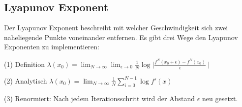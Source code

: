 \documentclass{scrartcl}
\begin{document}
\subsection{Lyapunov Exponent}
Der Lyapunov Exponent beschreibt mit welcher Geschwindigkeit sich zwei naheliegende Punkte voneinander entfernen. 
Es gibt drei Wege den Lyapunov Exponenten zu implementieren:

(1) Definition
$\lambda(x_0) = \lim_{N \rightarrow \infty}\lim_{\epsilon \rightarrow 0} \frac{1}{N}\log{\mid \frac{f^N(x_0+\epsilon)- f^N(x_0)}{\epsilon} \mid} $


(2) Analytisch
$\lambda(x_0) = \lim_{N \rightarrow \infty} \frac{1}{N} \sum_{i=0}^{N-1}  \log{f'(x)} $


(3) Renormiert:
Nach jedem Iterationsschritt wird der Abstand $\epsilon$ neu gesetzt.
\end{document}
